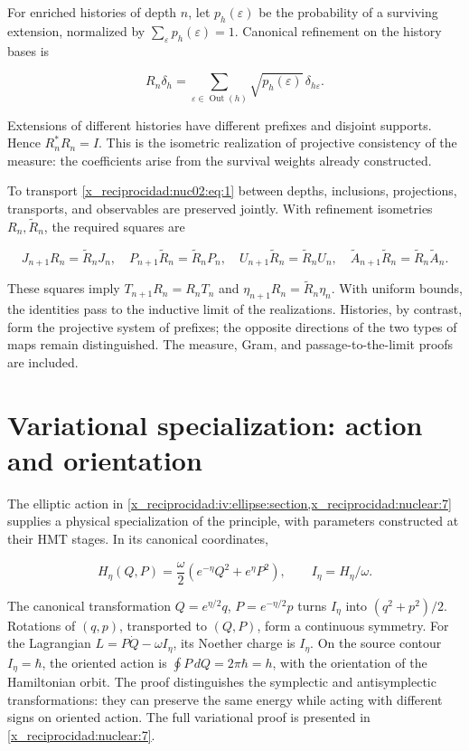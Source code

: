 For enriched histories of depth \(n\), let \(p_h(\varepsilon)\) be the probability of a surviving extension, normalized by \(\sum_\varepsilon p_h(\varepsilon)=1\). Canonical refinement on the history bases is

\[
R_n\delta_h=\sum_{\varepsilon\in\operatorname{Out}(h)}
\sqrt{p_h(\varepsilon)}\,\delta_{h\varepsilon}.
\]

Extensions of different histories have different prefixes and disjoint supports. Hence \(R_n^*R_n=I\). This is the isometric realization of projective consistency of the measure: the coefficients arise from the survival weights already constructed.

To transport \eqref{x_reciprocidad:nuc02:eq:1} between depths, inclusions, projections, transports, and observables are preserved jointly. With refinement isometries \(R_n,\widetilde R_n\), the required squares are

\[
J_{n+1}R_n=\widetilde R_nJ_n,\quad
P_{n+1}\widetilde R_n=\widetilde R_nP_n,\quad
U_{n+1}\widetilde R_n=\widetilde R_nU_n,\quad
\widetilde A_{n+1}\widetilde R_n=\widetilde R_n\widetilde A_n.
\]

These squares imply \(T_{n+1}R_n=R_nT_n\) and \(\eta_{n+1}R_n=\widetilde R_n\eta_n\). With uniform bounds, the identities pass to the inductive limit of the realizations. Histories, by contrast, form the projective system of prefixes; the opposite directions of the two types of maps remain distinguished. The measure, Gram, and passage-to-the-limit proofs are included.

\section{Variational specialization: action and orientation}

The elliptic action in \cref{x_reciprocidad:iv:ellipse:section,x_reciprocidad:nuclear:7} supplies a physical specialization of the principle, with parameters constructed at their HMT stages. In its canonical coordinates,

\[
H_\eta(Q,P)=\frac{\omega}{2}
\left(e^{-\eta}Q^2+e^\eta P^2\right),\qquad
I_\eta=H_\eta/\omega.
\]

The canonical transformation \(Q=e^{\eta/2}q\), \(P=e^{-\eta/2}p\) turns \(I_\eta\) into \((q^2+p^2)/2\). Rotations of \((q,p)\), transported to \((Q,P)\), form a continuous symmetry. For the Lagrangian \(L=P\dot Q-\omega I_\eta\), its Noether charge is \(I_\eta\). On the source contour \(I_\eta=\hbar\), the oriented action is \(\oint P\,dQ=2\pi\hbar=h\), with the orientation of the Hamiltonian orbit. The proof distinguishes the symplectic and antisymplectic transformations: they can preserve the same energy while acting with different signs on oriented action. The full variational proof is presented in \cref{x_reciprocidad:nuclear:7}.

